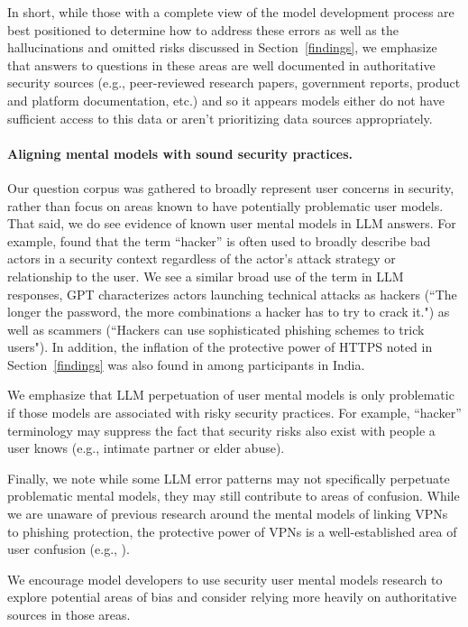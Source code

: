 In short, while those with a complete view of the model development process are best positioned to determine how to address these errors as well as the hallucinations and omitted risks discussed in Section~\ref{findings}, we emphasize that answers to questions in these areas are well documented in authoritative security sources (e.g., peer-reviewed research papers, government reports, product and platform documentation, etc.) and so it appears models either do not have sufficient access to this data or aren’t prioritizing data sources appropriately.

\paragraph{Aligning mental models with sound security practices.} Our question corpus was gathered to broadly represent user concerns in security, rather than focus on areas known to have potentially problematic user models. That said, we do see evidence of known user mental models in LLM answers. For example, \cite{wash2010folk} found that the term ``hacker'' is often used to broadly describe bad actors in a security context regardless of the actor's attack strategy or relationship to the user. We see a similar broad use of the term in LLM responses, GPT characterizes actors launching technical attacks as hackers (``The longer the password, the more combinations a hacker has to try to crack it.") as well as scammers (``Hackers can use sophisticated phishing schemes to trick users"). In addition, the inflation of the protective power of HTTPS noted in Section~\ref{findings} was also found in \cite{herbert2023world} among participants in India.

We emphasize that LLM perpetuation of user mental models is only problematic if those models are associated with risky security practices. For example, ``hacker'' terminology may suppress the fact that security risks also exist with people a user knows (e.g., intimate partner or elder abuse).

Finally, we note while some LLM error patterns may not specifically perpetuate problematic mental models, they may still contribute to areas of confusion. While we are unaware of previous research around the mental models of linking VPNs to phishing protection, the protective power of VPNs is a well-established area of user confusion (e.g., \cite{dutkowska2022and, binkhorst2022security}).

We encourage model developers to use security user mental models research to explore potential areas of bias and consider relying more heavily on authoritative sources in those areas.
 

